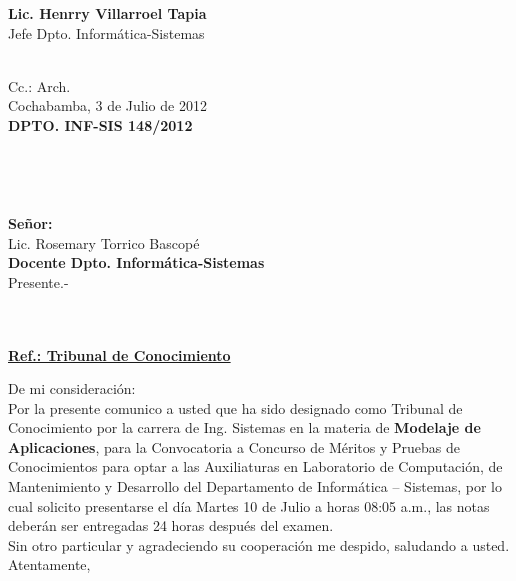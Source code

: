 \documentclass[letterpaper,11pt]{letter}
\begin{document}
\vspace{3.5cm}
\begin{center}
\begin{minipage}[b]{0.5\textwidth}
\begin{center}
{\bf Lic. Henrry Villarroel Tapia}\\
Jefe Dpto. Informática-Sistemas\\
\end{center}
\end{minipage}
\end{center}
~\\
Cc.: Arch.\\
\newpage
Cochabamba, 3 de Julio de 2012~\\
 \textbf{DPTO. INF-SIS 148/2012}\\
~\\
~\\
~\\
~\\
 \textbf{Señor:}~\\
Lic. Rosemary Torrico Bascopé~\\
 \textbf{Docente Dpto. Informática-Sistemas}~\\
Presente.-\\
~\\
~\\
\begin{center}
\underline{ \textbf{Ref.: Tribunal de Conocimiento}}
\end{center}
De mi consideración:\\
Por la presente comunico a usted que ha sido designado como Tribunal de Conocimiento por la carrera de Ing. Sistemas en la materia de \textbf{Modelaje de Aplicaciones}, para la Convocatoria a Concurso de Méritos y Pruebas de Conocimientos para optar a las Auxiliaturas en Laboratorio de Computación, de Mantenimiento y Desarrollo del Departamento de Informática – Sistemas, por lo cual solicito presentarse el día Martes 10 de Julio a horas 08:05 a.m., las notas deberán ser entregadas 24 horas después del examen.\\
Sin otro particular y agradeciendo su cooperación me despido, saludando a usted.\\
Atentamente,\\
\end{document}
